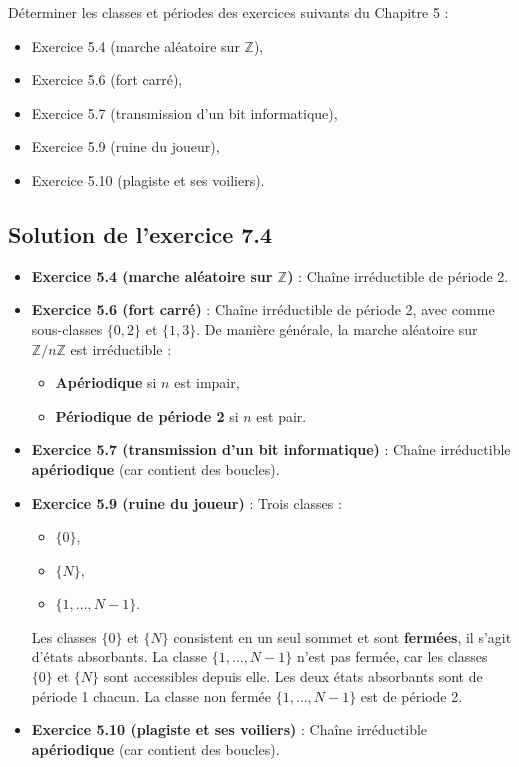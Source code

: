 \begin{exercise}[7.4]
Déterminer les classes et périodes des exercices suivants du Chapitre 5 :
\begin{itemize}
    \item Exercice 5.4 (marche aléatoire sur $\mathbb{Z}$),
    \item Exercice 5.6 (fort carré),
    \item Exercice 5.7 (transmission d’un bit informatique),
    \item Exercice 5.9 (ruine du joueur),
    \item Exercice 5.10 (plagiste et ses voiliers).
\end{itemize}
\end{exercise}

\subsection*{Solution de l’exercice 7.4}
\begin{itemize}
    \item \textbf{Exercice 5.4 (marche aléatoire sur $\mathbb{Z}$)} : Chaîne irréductible de période 2.
    \item \textbf{Exercice 5.6 (fort carré)} : Chaîne irréductible de période 2, avec comme sous-classes $\{0, 2\}$ et $\{1, 3\}$. De manière générale, la marche aléatoire sur $\mathbb{Z}/n\mathbb{Z}$ est irréductible :
    \begin{itemize}
        \item \textbf{Apériodique} si $n$ est impair,
        \item \textbf{Périodique de période 2} si $n$ est pair.
    \end{itemize}
    \item \textbf{Exercice 5.7 (transmission d’un bit informatique)} : Chaîne irréductible \textbf{apériodique} (car contient des boucles).
    \item \textbf{Exercice 5.9 (ruine du joueur)} : Trois classes :
    \begin{itemize}
        \item $\{0\}$,
        \item $\{N\}$,
        \item $\{1, \dots, N-1\}$.
    \end{itemize}
    Les classes $\{0\}$ et $\{N\}$ consistent en un seul sommet et sont \textbf{fermées}, il s’agit d’états absorbants. La classe $\{1, \dots, N-1\}$ n’est pas fermée, car les classes $\{0\}$ et $\{N\}$ sont accessibles depuis elle. Les deux états absorbants sont de période 1 chacun. La classe non fermée $\{1, \dots, N-1\}$ est de période 2.
    \item \textbf{Exercice 5.10 (plagiste et ses voiliers)} : Chaîne irréductible \textbf{apériodique} (car contient des boucles).
\end{itemize}
